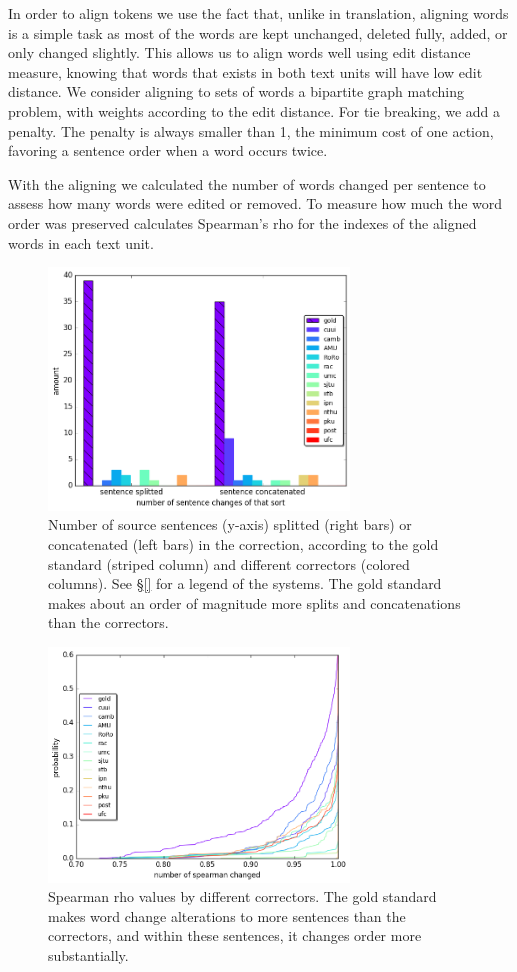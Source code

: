 \documentclass[english]{article}
\begin{document}
In order to align tokens we use the fact that, unlike in translation,
aligning words is a simple task as most of the words are kept unchanged,
deleted fully, added, or only changed slightly. This allows us to
align words well using edit distance measure, knowing that words that
exists in both text units will have low edit distance. We consider
aligning to sets of words a bipartite graph matching problem, with
weights according to the edit distance. For tie breaking, we add a
penalty. The penalty is always smaller than 1, the minimum cost of
one action, favoring a sentence order when a word occurs twice.
 
With the aligning we calculated the number of words changed per sentence to assess how many words were edited or removed. 
To measure how much the word order was preserved
calculates Spearman's rho for the indexes of the aligned words in each text unit.

\begin{figure}
	\includegraphics[width = 8cm]{aligned}
	\caption{Number of source sentences (y-axis) splitted (right bars) or concatenated (left bars) in the correction,
          according to
          the gold standard (striped column) and different correctors (colored columns). See \S\ref{} for a legend
          of the systems. The gold standard makes about an order of magnitude more splits and
          concatenations than the correctors.}
	\label{fig:split}
\end{figure}

\begin{figure}
	\includegraphics[width = 8cm]{spearman_ecdf}
	\caption{Spearman rho values by different correctors.
          The gold standard makes word change alterations to more sentences than the correctors,
          and within these sentences, it changes order more substantially.}
	\label{fig:rho}
\end{figure}
\end{document}
